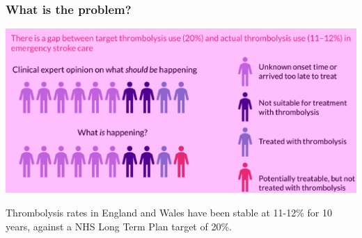 \documentclass[xcolor={usenames,dvipsnames}]{beamer}
\begin{document}

\begin{frame}
\frametitle{What is the problem?}

\begin{center}
\includegraphics[width=1.0\textwidth]{./images_pink/sam_summary_pt_1}
\end{center}

 
Thrombolysis rates in England and Wales have been stable at 11-12\% for 10 years, against a NHS Long Term Plan target of 20\%.



\end{frame}




\end{document}
